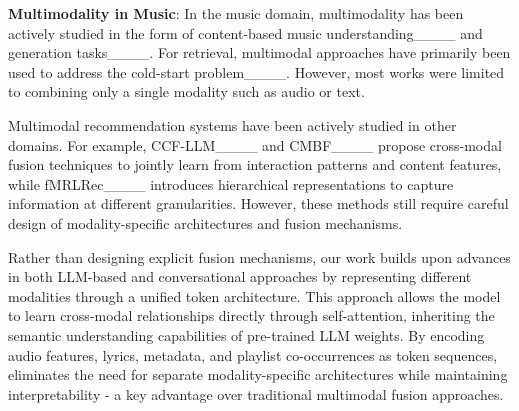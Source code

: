 \textbf{Multimodality in Music}:
In the music domain, multimodality has been actively studied in the form of content-based music understanding____ and generation tasks____. For retrieval, multimodal approaches have primarily been used to address the cold-start problem____. However, most works were limited to combining only a single modality such as audio or text. 


Multimodal recommendation systems have been actively studied in other domains. For example,
CCF-LLM____ and CMBF____ propose cross-modal fusion techniques to jointly learn from interaction patterns and content features, while fMRLRec____ introduces hierarchical representations to capture information at different granularities. However, these methods still require careful design of modality-specific architectures and fusion mechanisms.



Rather than designing explicit fusion mechanisms, our work builds upon advances in both LLM-based and conversational approaches by representing different modalities through a unified token architecture. This approach allows the model to learn cross-modal relationships directly through self-attention, inheriting the semantic understanding capabilities of pre-trained LLM weights. By encoding audio features, lyrics, metadata, and playlist co-occurrences as token sequences, \modelname eliminates the need for separate modality-specific architectures while maintaining interpretability - a key advantage over traditional multimodal fusion approaches.